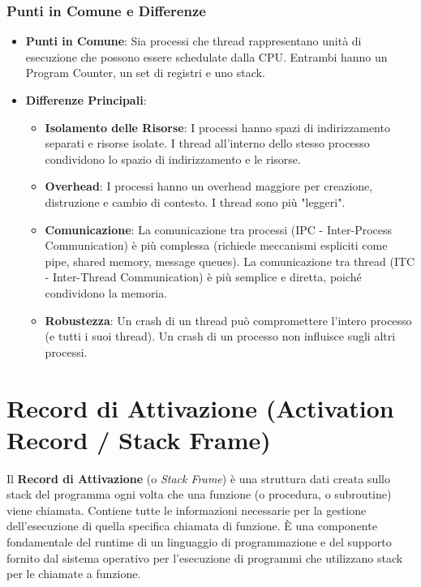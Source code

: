 \subsubsection{Punti in Comune e Differenze}
\begin{itemize}
    \item \textbf{Punti in Comune}: Sia processi che thread rappresentano unità di esecuzione che possono essere schedulate dalla CPU. Entrambi hanno un Program Counter, un set di registri e uno stack.
    \item \textbf{Differenze Principali}:
    \begin{itemize}
        \item \textbf{Isolamento delle Risorse}: I processi hanno spazi di indirizzamento separati e risorse isolate. I thread all'interno dello stesso processo condividono lo spazio di indirizzamento e le risorse.
        \item \textbf{Overhead}: I processi hanno un overhead maggiore per creazione, distruzione e cambio di contesto. I thread sono più "leggeri".
        \item \textbf{Comunicazione}: La comunicazione tra processi (IPC - Inter-Process Communication) è più complessa (richiede meccanismi espliciti come pipe, shared memory, message queues). La comunicazione tra thread (ITC - Inter-Thread Communication) è più semplice e diretta, poiché condividono la memoria.
        \item \textbf{Robustezza}: Un crash di un thread può compromettere l'intero processo (e tutti i suoi thread). Un crash di un processo non influisce sugli altri processi.
    \end{itemize}
\end{itemize}

\section{Record di Attivazione (Activation Record / Stack Frame)}
Il \textbf{Record di Attivazione} (o \textit{Stack Frame}) è una struttura dati creata sullo stack del programma ogni volta che una funzione (o procedura, o subroutine) viene chiamata. Contiene tutte le informazioni necessarie per la gestione dell'esecuzione di quella specifica chiamata di funzione. È una componente fondamentale del runtime di un linguaggio di programmazione e del supporto fornito dal sistema operativo per l'esecuzione di programmi che utilizzano stack per le chiamate a funzione.

